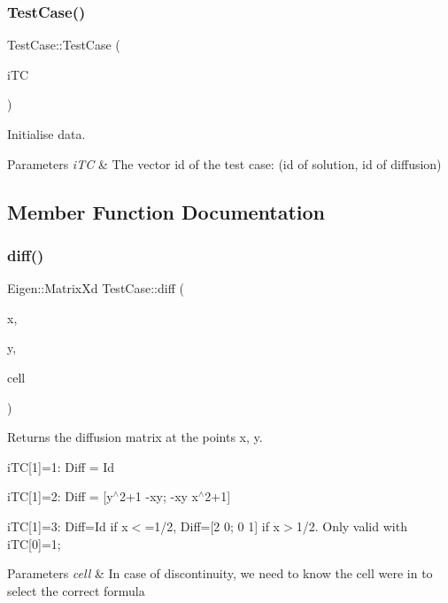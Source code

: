 \subsubsection{\texorpdfstring{Test\+Case()}{TestCase()}}
{\footnotesize\ttfamily Test\+Case\+::\+Test\+Case (\begin{DoxyParamCaption}\item[{const std\+::vector$<$ int $>$}]{i\+TC }\end{DoxyParamCaption})}



Initialise data. 


\begin{DoxyParams}{Parameters}
{\em i\+TC} & The vector id of the test case\+: (id of solution, id of diffusion) \\
\hline
\end{DoxyParams}


\subsection{Member Function Documentation}
\mbox{\label{classTestCase_a4015f763a8a2979e896766683c6dfbfd}} 
\subsubsection{\texorpdfstring{diff()}{diff()}}
{\footnotesize\ttfamily Eigen\+::\+Matrix\+Xd Test\+Case\+::diff (\begin{DoxyParamCaption}\item[{const double}]{x,  }\item[{const double}]{y,  }\item[{const \hyperlink{classHArDCore2D_1_1Cell}{Cell} $\ast$}]{cell }\end{DoxyParamCaption})}



Returns the diffusion matrix at the points x, y. 

i\+TC\mbox{[}1\mbox{]}=1\+: Diff = Id

i\+TC\mbox{[}1\mbox{]}=2\+: Diff = \mbox{[}y$^\wedge$2+1 -\/xy; -\/xy x$^\wedge$2+1\mbox{]}

i\+TC\mbox{[}1\mbox{]}=3\+: Diff=Id if x$<$=1/2, Diff=\mbox{[}2 0; 0 1\mbox{]} if x$>$1/2. Only valid with i\+TC\mbox{[}0\mbox{]}=1; 
\begin{DoxyParams}{Parameters}
{\em cell} & In case of discontinuity, we need to know the cell we\textquotesingle{}re in to select the correct formula \\
\hline
\end{DoxyParams}
\mbox{\label{classTestCase_a1826d1e2781e2209512eac2dac5c84f7}} 
